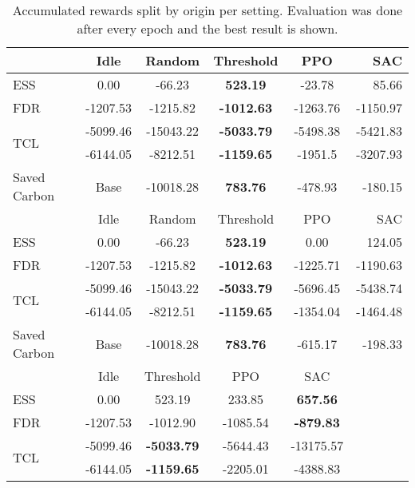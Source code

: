 \documentclass{article}
\begin{document}
\begin{table*}[t]
    \caption{Accumulated rewards split by origin per setting. Evaluation was done after every epoch and the best result is shown.}
    \label{tab:experiments_transposed}
    \vskip 0.15in
    \begin{center}
    \begin{small}
    \begin{sc}
    \begin{tabular}{lccccr}
    \toprule
                         & Idle     & Random  & Threshold & PPO      & SAC\\
    \midrule
    ESS                  & 0.00     &-66.23& \textbf{523.19}    & -23.78   & 85.66\\
    FDR                  & -1207.53 &-1215.82& \textbf{-1012.63}  & -1263.76 & -1150.97\\
    \multirow{2}{*}{TCL} & -5099.46 &-15043.22& \textbf{-5033.79}  & -5498.38 & -5421.83\\
                         & -6144.05 &-8212.51& \textbf{-1159.65}  & -1951.5  & -3207.93\\
    Saved Carbon         & Base     &-10018.28& \textbf{783.76}    & -478.93  & -180.15\\
    \midrule
                         & Idle     & Random& Threshold & PPO      & SAC\\
    \midrule
    ESS                  & 0.00     &-66.23& \textbf{523.19}    & 0.00     & 124.05\\
    FDR                  & -1207.53 &-1215.82& \textbf{-1012.63}  & -1225.71 & -1190.63\\
    \multirow{2}{*}{TCL} & -5099.46 &-15043.22& \textbf{-5033.79}  & -5696.45 & -5438.74\\
                         & -6144.05 &-8212.51& \textbf{-1159.65}  & -1354.04 & -1464.48\\
    Saved Carbon         & Base     &-10018.28& \textbf{783.76}    & -615.17  & -198.33\\
    \midrule
                         & Idle     & Threshold & PPO      & SAC\\
    \midrule
    ESS                  & 0.00     & 523.19    & 233.85   & \textbf{657.56}\\
    FDR                  & -1207.53 & -1012.90  & -1085.54 & \textbf{-879.83}\\
    \multirow{2}{*}{TCL} & -5099.46 & \textbf{-5033.79}  & -5644.43 & -13175.57\\
                         & -6144.05 & \textbf{-1159.65}  & -2205.01 & -4388.83\\

\end{tabular}
\end{sc}
\end{small}
\end{center}
\end{table*}
\end{document}
